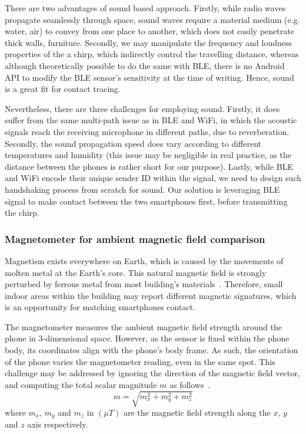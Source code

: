 \documentclass[graybox]{svmult}
\begin{document}

There are two advantages of sound based approach. Firstly, while radio waves propagate seamlessly through space, sound waves require a material medium (e.g. water, air) to convey from one place to another, which does not easily penetrate thick walls, furniture. Secondly, we may manipulate the frequency and loudness properties of the a chirp, which indirectly control the travelling distance, whereas although theoretically possible to do the same with BLE, there is no Android API to modify the BLE sensor's sensitivity at the time of writing. Hence, sound is a great fit for contact tracing.

Nevertheless, there are three challenges for employing sound. Firstly, it does suffer from the same multi-path issue as in BLE and WiFi, in which the acoustic signals reach the receiving microphone in different paths, due to reverberation. Secondly, the sound propagation speed does vary according to different temperatures and humidity (this issue may be negligible in real practice, as the distance between the phones is rather short for our purpose). Lastly, while BLE and WiFi encode their unique sender ID within the signal, we need to design such handshaking process from scratch for sound. Our solution is leveraging BLE signal to make contact between the two smartphones first, before transmitting the chirp.


\subsubsection{Magnetometer for ambient magnetic field comparison}
\label{sec:magnetometer}
Magnetism exists everywhere on Earth, which is caused by the movements of molten metal at the Earth's core. This natural magnetic field is strongly perturbed by ferrous metal from most building's materials~\cite{kim2016novel,kim2017indoor,storms2019magnetic}. Therefore, small indoor areas within the building may report different magnetic signatures, which is an opportunity for matching smartphones contact.

The magnetometer measures the ambient magnetic field strength around the phone in 3-dimensional space. However, as the sensor is fixed within the phone body, its coordinates align with the phone's body frame. As such, the orientation of the phone varies the magnetometer reading, even in the same spot. This challenge may be addressed by ignoring the direction of the magnetic field vector, and computing the total scalar magnitude $m$ as follows~\cite{nguyen2017co}.
\begin{equation}
    m = \sqrt{m_x^2 + m_y^2 + m_z^2}
\end{equation}
where $m_x$, $m_y$ and $m_z$ in $(\mu T)$ are the magnetic field strength along the $x$, $y$ and $z$ axis respectively.
\end{document}
